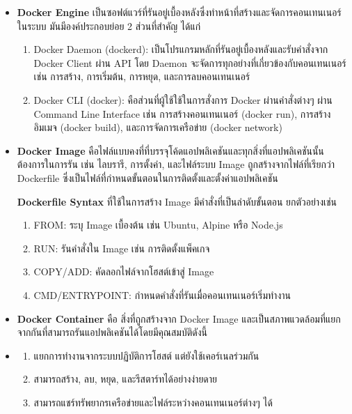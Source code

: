 \begin{itemize}
  \item \textbf{Docker Engine} เป็นซอฟต์แวร์ที่รันอยู่เบื้องหลังซึ่งทำหน้าที่สร้างและจัดการคอนเทนเนอร์ในระบบ มันมีองค์ประกอบย่อย 2 ส่วนที่สำคัญ ได้แก่
  \begin{enumerate}
    \item Docker Daemon (dockerd): เป็นโปรแกรมหลักที่รันอยู่เบื้องหลังและรับคำสั่งจาก Docker Client ผ่าน API โดย Daemon จะจัดการทุกอย่างที่เกี่ยวข้องกับคอนเทนเนอร์ เช่น การสร้าง, การเริ่มต้น, การหยุด, และการลบคอนเทนเนอร์
    \item Docker CLI (docker): คือส่วนที่ผู้ใช้ใช้ในการสั่งการ Docker ผ่านคำสั่งต่างๆ ผ่าน Command Line Interface เช่น การสร้างคอนเทนเนอร์ (docker run), การสร้างอิมเมจ (docker build), และการจัดการเครือข่าย (docker network)
  \end{enumerate}
  \item \textbf{Docker Image} คือไฟล์แบบคงที่ที่บรรจุโค้ดแอปพลิเคชันและทุกสิ่งที่แอปพลิเคชันนั้นต้องการในการรัน เช่น ไลบรารี, การตั้งค่า, และไฟล์ระบบ Image ถูกสร้างจากไฟล์ที่เรียกว่า Dockerfile ซึ่งเป็นไฟล์ที่กำหนดขั้นตอนในการติดตั้งและตั้งค่าแอปพลิเคชัน
  
  \textbf{Dockerfile Syntax} ที่ใช้ในการสร้าง Image มีคำสั่งที่เป็นลำดับขั้นตอน ยกตัวอย่างเช่น
  \hspace{1cm}\begin{enumerate}
    \item FROM: ระบุ Image เบื้องต้น เช่น Ubuntu, Alpine หรือ Node.js
    \item RUN: รันคำสั่งใน Image เช่น การติดตั้งแพ็คเกจ
    \item COPY/ADD: คัดลอกไฟล์จากโฮสต์เข้าสู่ Image
    \item CMD/ENTRYPOINT: กำหนดคำสั่งที่รันเมื่อคอนเทนเนอร์เริ่มทำงาน
  \end{enumerate}
  \item \textbf{Docker Container} คือ สิ่งที่ถูกสร้างจาก Docker Image และเป็นสภาพแวดล้อมที่แยกจากกันที่สามารถรันแอปพลิเคชันได้โดยมีคุณสมบัติดังนี้
  \item \begin{enumerate}
    \item แยกการทำงานจากระบบปฏิบัติการโฮสต์ แต่ยังใช้เคอร์เนลร่วมกัน
    \item สามารถสร้าง, ลบ, หยุด, และรีสตาร์ทได้อย่างง่ายดาย
    \item สามารถแชร์ทรัพยากรเครือข่ายและไฟล์ระหว่างคอนเทนเนอร์ต่างๆ ได้
  \end{enumerate}
\end{itemize}

